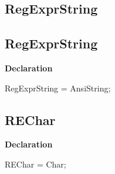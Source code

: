 \documentclass{report}
\newif\ifpdf
\begin{document}
\subsection*{\large{\textbf{RegExprString}}\normalsize\hspace{1ex}\hrulefill}
\else
\subsection*{RegExprString}
\fi
\label{RegExpr-RegExprString}
\begin{list}{}{
\setlength{\itemindent}{0cm}
\setlength{\listparindent}{0cm}
\setlength{\leftmargin}{\evensidemargin}
\addtolength{\leftmargin}{\tmplength}
\settowidth{\labelsep}{X}
\addtolength{\leftmargin}{\labelsep}
\setlength{\labelwidth}{\tmplength}
}
\item[\textbf{Declaration}\hfill]
\ifpdf
\begin{flushleft}
\fi
\begin{ttfamily}
RegExprString = AnsiString;\end{ttfamily}

\ifpdf
\end{flushleft}
\fi

\end{list}
\ifpdf
\subsection*{\large{\textbf{REChar}}\normalsize\hspace{1ex}\hrulefill}
\else
\subsection*{REChar}
\fi
\label{RegExpr-REChar}
\begin{list}{}{
\setlength{\itemindent}{0cm}
\setlength{\listparindent}{0cm}
\setlength{\leftmargin}{\evensidemargin}
\addtolength{\leftmargin}{\tmplength}
\settowidth{\labelsep}{X}
\addtolength{\leftmargin}{\labelsep}
\setlength{\labelwidth}{\tmplength}
}
\item[\textbf{Declaration}\hfill]
\ifpdf
\begin{flushleft}
\fi
\begin{ttfamily}
REChar = Char;\end{ttfamily}

\ifpdf
\end{flushleft}
\fi

\end{list}
\ifpdf
\end{document}
